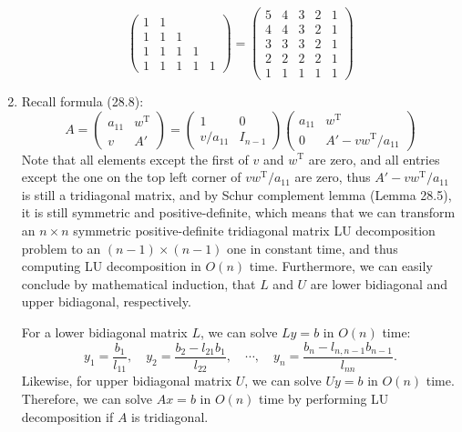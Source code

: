 \documentclass[a4paper,11pt]{article}
\begin{document}
\begin{enumerate}
$$\begin{pmatrix}
            1 & 1 &  &  &  \\
            1 & 1 & 1 &  &  \\
            1 & 1 & 1 & 1 &  \\
            1 & 1 & 1 & 1 & 1
          \end{pmatrix}
          =
          \begin{pmatrix}
            5 & 4 & 3 & 2 & 1 \\
            4 & 4 & 3 & 2 & 1 \\
            3 & 3 & 3 & 2 & 1 \\
            2 & 2 & 2 & 2 & 1 \\
            1 & 1 & 1 & 1 & 1
          \end{pmatrix}$$
      \item Recall formula (28.8):
      $$A = \begin{pmatrix} a_{11} & w^{\text{T}} \\ v & A' \end{pmatrix}
          = \begin{pmatrix} 1 & 0 \\ v/a_{11} & I_{n-1} \end{pmatrix}
          \begin{pmatrix} a_{11} & w^{\text{T}} \\ 0 & A'-vw^{\text{T}}/a_{11} \end{pmatrix}$$
      Note that all elements except the first of $v$ and $w^{\text{T}}$ are zero, and all entries except the one on the top left corner of $vw^{\text{T}}/a_{11}$ are zero, thus $A'-vw^{\text{T}}/a_{11}$ is still a tridiagonal matrix, and by Schur complement lemma (Lemma 28.5), it is still symmetric and positive-definite, which means that we can transform an $n \times n$ symmetric positive-definite tridiagonal matrix LU decomposition problem to an $(n-1) \times (n-1)$ one in constant time, and thus computing LU decomposition in $O(n)$ time. Furthermore, we can easily conclude by mathematical induction, that $L$ and $U$ are lower bidiagonal and upper bidiagonal, respectively. \par
      For a lower bidiagonal matrix $L$, we can solve $Ly = b$ in $O(n)$ time:
      $$y_1 = \frac{b_1}{l_{11}},\quad y_2 = \frac{b_2-l_{21}b_1}{l_{22}},\quad \cdots, \quad y_n = \frac{b_n-l_{n, n-1}b_{n-1}}{l_{nn}}.$$
      Likewise, for upper bidiagonal matrix $U$, we can solve $Uy = b$ in $O(n)$ time. Therefore, we can solve $Ax = b$ in $O(n)$ time by performing LU decomposition if $A$ is tridiagonal. \par

\end{enumerate}
\end{document}
